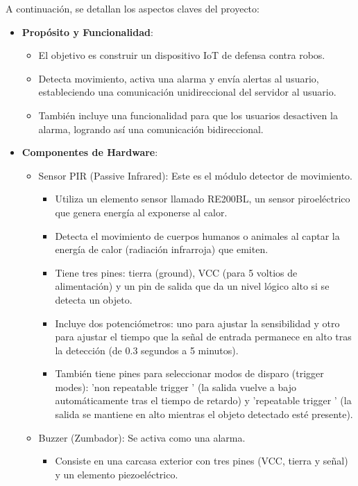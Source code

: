 \documentclass{report}
\begin{document}
A continuación, se detallan los aspectos claves del proyecto:
\begin{itemize}
    \item \textbf{Propósito y Funcionalidad}:
    \begin{itemize}
        \item El objetivo es construir un  dispositivo IoT de defensa contra robos.
        \item Detecta movimiento, activa una alarma y envía alertas al usuario, estableciendo una comunicación unidireccional del servidor al usuario.
        \item También incluye una funcionalidad para que los usuarios desactiven la alarma, logrando así una comunicación bidireccional. 
    \end{itemize}
    \item \textbf{Componentes de Hardware}:
    \begin{itemize}
        \item Sensor PIR (Passive Infrared): Este es el módulo detector de movimiento.
            \begin{itemize}
                \item Utiliza un elemento sensor llamado RE200BL, un sensor piroeléctrico que genera energía al exponerse al calor.
                \item Detecta el movimiento de cuerpos humanos o animales al captar la energía de calor (radiación infrarroja) que emiten.
                \item Tiene tres pines: tierra (ground), VCC (para 5 voltios de alimentación) y un pin de salida que da un nivel lógico alto si se detecta un 
                objeto.
                \item Incluye dos potenciómetros: uno para ajustar la sensibilidad y otro para ajustar el tiempo que la señal de entrada permanece en alto 
                tras la detección (de 0.3 segundos a 5 minutos).
                \item También tiene pines para seleccionar modos de disparo (trigger modes):  'non repeatable trigger ' (la salida vuelve a bajo 
                automáticamente tras el tiempo de retardo) y  'repeatable trigger ' (la salida se mantiene en alto mientras el objeto detectado esté presente).
            \end{itemize}
        \item Buzzer (Zumbador): Se activa como una alarma.
            \begin{itemize}
                \item Consiste en una carcasa exterior con tres pines (VCC, tierra y señal) y un elemento piezoeléctrico.

\end{itemize}
\end{itemize}
\end{itemize}
\end{document}
